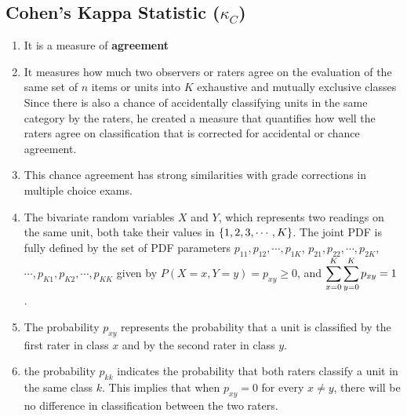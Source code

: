 \subsection{Cohen’s Kappa Statistic ($\kappa_C$)}


\begin{enumerate}
    \item It is a measure of \textbf{agreement}
    \hfill \cite{statistics/book/Statistics-for-Data-Scientists/Maurits-Kaptein}

    \item It measures how much two observers or raters agree on the evaluation of the same set of $n$ items or units into $K$ exhaustive and mutually exclusive classes
    Since there is also a chance of accidentally classifying units in the same category by the raters, he created a measure that quantifies how well the raters agree on classification that is corrected for accidental or chance agreement. 
    \hfill \cite{statistics/book/Statistics-for-Data-Scientists/Maurits-Kaptein}

    \item This chance agreement has strong similarities with grade corrections in multiple choice exams.
    \hfill \cite{statistics/book/Statistics-for-Data-Scientists/Maurits-Kaptein}

    \item The bivariate random variables $X$ and $Y$, which represents two readings on the same unit, both take their values in $\left\{1, 2, 3, \cdots , K \right\}$. 
    The joint PDF is fully defined by the set of PDF parameters $p_{11}, p_{12}, \cdots , p_{1K}$, $p_{21}, p_{22}, \cdots , p_{2K}$, $\cdots , p_{K 1}, p_{K 2}, \cdots , p_{K K}$ given by $P(X = x, Y = y) = p_{x y} \geq 0$, and $\displaystyle\sum^K_{x=0} \displaystyle\sum^K_{y=0} p_{x y} = 1$.
    \hfill \cite{statistics/book/Statistics-for-Data-Scientists/Maurits-Kaptein}

    \item The probability $p_{x y}$ represents the probability that a unit is classified by the first rater in class $x$ and by the second rater in class $y$. 
    \hfill \cite{statistics/book/Statistics-for-Data-Scientists/Maurits-Kaptein}

    \item the probability $p_{kk}$ indicates the probability that both raters classify a unit in the same class $k$. 
    This implies that when $p_{x y} = 0$ for every $x \neq y$, there will be no difference in classification between the two raters.
    \hfill \cite{statistics/book/Statistics-for-Data-Scientists/Maurits-Kaptein}


\end{enumerate}
